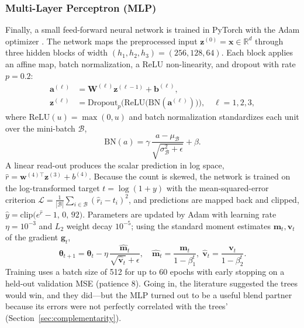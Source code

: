 \documentclass[journal]{IEEEtran}
\begin{document}
\subsubsection{Multi-Layer Perceptron (MLP)}
\label{sec:mlp}
Finally, a small feed-forward neural network is trained in PyTorch
\cite{paszke2019pytorch} with the Adam optimizer \cite{kingma2015adam}. The network maps the preprocessed input
$\mathbf{z}^{(0)}=\mathbf{x}\in\mathbb{R}^{d}$ through three hidden blocks of
width $(h_1,h_2,h_3)=(256,128,64)$. Each block applies an affine map, batch
normalization, a ReLU non-linearity, and dropout with rate $p=0.2$:
\begin{align}
\mathbf{a}^{(\ell)} &= \mathbf{W}^{(\ell)}\mathbf{z}^{(\ell-1)}+\mathbf{b}^{(\ell)},
\label{eq:mlp_aff}\\
\mathbf{z}^{(\ell)} &= \mathrm{Dropout}_{p}\!\Big(\mathrm{ReLU}\big(
\mathrm{BN}(\mathbf{a}^{(\ell)})\big)\Big),\quad \ell=1,2,3,
\label{eq:mlp_block}
\end{align}
where $\mathrm{ReLU}(u)=\max(0,u)$ and batch normalization standardizes each
unit over the mini-batch $\mathcal{B}$,
\begin{equation}
\mathrm{BN}(a)=\gamma\,\frac{a-\mu_{\mathcal{B}}}{\sqrt{\sigma_{\mathcal{B}}^{2}+\epsilon}}+\beta .
\label{eq:bn}
\end{equation}
A linear read-out produces the scalar prediction in log space,
$\hat r=\mathbf{w}^{(4)\top}\mathbf{z}^{(3)}+b^{(4)}$. Because the count is
skewed, the network is trained on the log-transformed target
$t=\log(1+y)$ with the mean-squared-error criterion
$\mathcal{L}=\tfrac{1}{|\mathcal{B}|}\sum_{i\in\mathcal{B}}(\hat r_i-t_i)^2$, and
predictions are mapped back and clipped,
$\hat y=\mathrm{clip}\big(e^{\hat r}-1,\,0,\,92\big)$. Parameters are updated by
Adam with learning rate $\eta=10^{-3}$ and $L_2$ weight decay $10^{-5}$; using
the standard moment estimates $\mathbf{m}_t,\mathbf{v}_t$ of the gradient
$\mathbf{g}_t$,
\begin{equation}
\boldsymbol{\theta}_{t+1}=\boldsymbol{\theta}_{t}
-\eta\,\frac{\hat{\mathbf m}_t}{\sqrt{\hat{\mathbf v}_t}+\epsilon},
\quad
\hat{\mathbf m}_t=\frac{\mathbf m_t}{1-\beta_1^{t}},\;
\hat{\mathbf v}_t=\frac{\mathbf v_t}{1-\beta_2^{t}}.
\label{eq:adam}
\end{equation}
Training uses a batch size of 512 for up to 60 epochs with early stopping on a
held-out validation MSE (patience 8). Going in, the literature
\cite{tang2024,camatti2024} suggested the trees would win, and they
did---but the MLP turned out to be a useful blend partner because its errors
were not perfectly correlated with the trees' (Section~\ref{sec:complementarity}).
\end{document}
